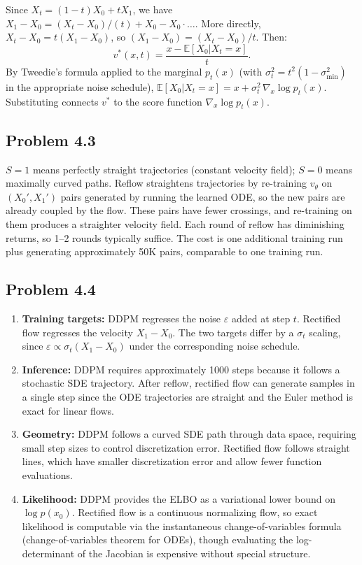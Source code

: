 \documentclass[11pt]{article}
\begin{document}
Since $X_t = (1-t)X_0 + tX_1$, we have $X_1 - X_0 = (X_t - X_0)/(t) + X_0 - X_0 \cdot \ldots$. More directly, $X_t - X_0 = t(X_1 - X_0)$, so $(X_1 - X_0) = (X_t - X_0)/t$. Then:
\[
v^*(x, t) = \frac{x - \mathbb{E}[X_0 | X_t = x]}{t}.
\]
By Tweedie's formula applied to the marginal $p_t(x)$ (with $\sigma_t^2 = t^2(1-\sigma_{\min}^2)$ in the appropriate noise schedule), $\mathbb{E}[X_0|X_t=x] = x + \sigma_t^2\,\nabla_x \log p_t(x)$. Substituting connects $v^*$ to the score function $\nabla_x \log p_t(x)$.

\subsection*{Problem 4.3}

$S=1$ means perfectly straight trajectories (constant velocity field); $S=0$ means maximally curved paths. Reflow straightens trajectories by re-training $v_\theta$ on $(X_0', X_1')$ pairs generated by running the learned ODE, so the new pairs are already coupled by the flow. These pairs have fewer crossings, and re-training on them produces a straighter velocity field. Each round of reflow has diminishing returns, so 1--2 rounds typically suffice. The cost is one additional training run plus generating approximately 50K pairs, comparable to one training run.

\subsection*{Problem 4.4}

\begin{enumerate}
    \item \textbf{Training targets:} DDPM regresses the noise $\varepsilon$ added at step $t$. Rectified flow regresses the velocity $X_1 - X_0$. The two targets differ by a $\sigma_t$ scaling, since $\varepsilon \propto \sigma_t (X_1 - X_0)$ under the corresponding noise schedule.

    \item \textbf{Inference:} DDPM requires approximately 1000 steps because it follows a stochastic SDE trajectory. After reflow, rectified flow can generate samples in a single step since the ODE trajectories are straight and the Euler method is exact for linear flows.

    \item \textbf{Geometry:} DDPM follows a curved SDE path through data space, requiring small step sizes to control discretization error. Rectified flow follows straight lines, which have smaller discretization error and allow fewer function evaluations.

    \item \textbf{Likelihood:} DDPM provides the ELBO as a variational lower bound on $\log p(x_0)$. Rectified flow is a continuous normalizing flow, so exact likelihood is computable via the instantaneous change-of-variables formula (change-of-variables theorem for ODEs), though evaluating the log-determinant of the Jacobian is expensive without special structure.
\end{enumerate}
\end{document}
